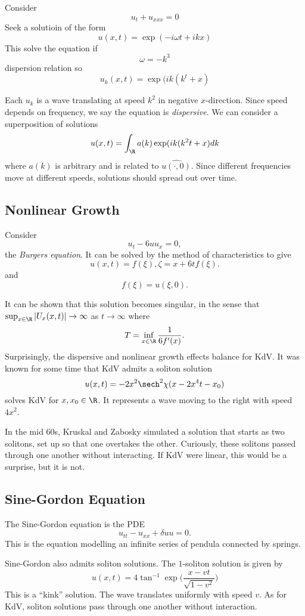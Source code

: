 \documentclass[a4paper]{article}
\begin{document}


Consider
\[
  u_t + u_{xxx} =0
\]
Seek a solutioin of the form
\[
  u(x,t) = \exp(-i\omega t+ ikx)
\]
This solve the equation if
\[
  \omega = -k^3
\]
dispersion relation
so
\[
  u_k(x,t) = \exp(ik(k^t+x)
\]

Each \(u_k\) is a wave translating at speed \(k^2\) in negative \(x\)-direction. Since speed depends on frequency, we say the equation is \emph{dispersive}. We can consider a superposition of solutions
\[
  u(x,t) = \int_{\R}^{ } a(k)\exp(ik(k^2t+x) dk
\]
where \(a(k)\) is arbitrary and is related to \(\hat{u(\cdot,0)}\). Since different frequencies move at different speeds, solutions should spread out over time.

\subsection{Nonlinear Growth}

Consider
\[
  u_t - 6 uu_x =0,
\]
the \emph{Burgers equation}. It can be solved by the method of characteristics to give
\[
  u(x,t) = f(\xi), \zeta = x+6tf(\xi).
\]
and
\[
  f(\xi) = u(\xi,0).
\]

It can be shown that this solution becomes singular, in the sense that \(\sup_{x\in\R}|U_x(x,t)| \to \infty\) as \(t\to \infty\) where
\[
  T = \inf_{x\in\R} \frac{1}{6f'(x)}.
\]
Surprisingly, the dispersive and nonlinear growth effects balance for KdV. It was known for some time that KdV admits a soliton solution
\[
  u(x,t) = -2x^2 \sech^2 \chi (x-2x^4t-x_0)
\]
solves KdV for \(x,x_0\in \R\). It represents a wave moving to the right with speed \(4x^2\).

In the mid 60s, Kruskal and Zabosky simulated a solution that starts as two solitons, set up so that one overtakes the other. Curiously, these solitons passed through one another without interacting. If KdV were linear, this would be a surprise, but it is not.

\subsection{Sine-Gordon Equation}

The Sine-Gordon equation is the PDE
\[
  u_{tt} - u_{xx} + \delta uu = 0.
\]
This is the equation modelling an infinite series of pendula connected by springs.

Sine-Gordon also admits soliton solutions. The \(1\)-soliton solution is given by
\[
  u(x,t) = 4\tan^{-1} \exp \Big( \frac{x-vt}{\sqrt{1-v^2}} \Big)
\]
This is a ``kink'' solution. The wave translates uniformly with speed \(v\). As for KdV, soliton solutions pass through one another without interaction.
\end{document}
